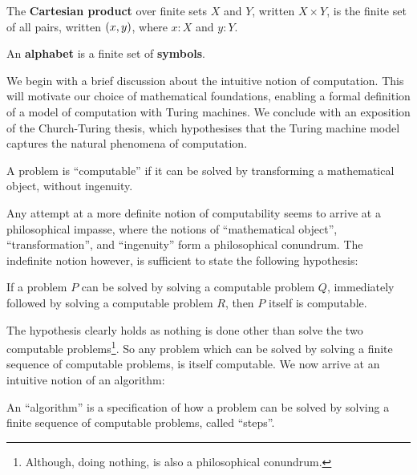 \begin{specification} The \textbf{Cartesian product} over finite sets $X$ and
$Y$, written $X\times Y$, is the finite set of all pairs, written $\mathopen{}\left({x,y}\right)\mathclose{}$,
where $x:X$ and $y:Y$. \end{specification}

\begin{alias} An \textbf{alphabet} is a finite set of \textbf{symbols}.
\end{alias}

\pagebreak

We begin with a brief discussion about the intuitive notion of computation.
This will motivate our choice of mathematical foundations, enabling a formal
definition of a model of computation with Turing machines. We conclude with an
exposition of the Church-Turing thesis, which hypothesises that the Turing
machine model captures the natural phenomena of computation.

\begin{notion} A problem is ``computable'' if it can be solved by transforming
a mathematical object, without ingenuity.
\end{notion}

Any attempt at a more definite notion of computability seems to arrive at a
philosophical impasse, where the notions of ``mathematical object'',
``transformation'', and ``ingenuity'' form a philosophical conundrum. The
indefinite notion however, is sufficient to state the following hypothesis:

\begin{hypothesis} \label{ths:problem-composition} If a problem $P$ can be
solved by solving a computable problem $Q$, immediately followed by solving a
computable problem $R$, then $P$ itself is computable. \end{hypothesis}

The hypothesis clearly holds as nothing is done other than solve the two
computable problems\footnote{Although, doing nothing, is also a philosophical
conundrum.}.  So any problem which can be solved by solving a finite sequence
of computable problems, is itself computable. We now arrive at an intuitive
notion of an algorithm:

\begin{notion} \label{ntn:problem-algorithm} An ``algorithm'' is a
specification of how a problem can be solved by solving a finite sequence of
computable problems, called ``steps''.\end{notion}


